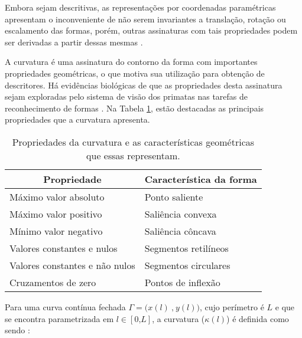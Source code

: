 
Embora sejam descritivas, as representações por coordenadas paramétricas apresentam o inconveniente de não serem invariantes a translação, rotação ou escalamento das formas, porém, outras assinaturas com tais propriedades podem ser derivadas a partir dessas mesmas \cite{Kindratenko:2003}.


A curvatura é uma assinatura do contorno da forma com importantes propriedades geométricas, o que motiva sua utilização para obtenção de descritores. Há evidências biológicas de que as propriedades desta assinatura sejam exploradas pelo sistema de visão dos primatas nas tarefas de reconhecimento de formas \cite{Costa:2009}. Na Tabela \ref{tbl:curv}, estão destacadas as principais propriedades que a curvatura apresenta.  

\begin{table}
\centering
\caption{\label{tbl:curv} Propriedades da curvatura e as características geométricas que essas representam.}
\begin{tabular}[]{ll}
\toprule
\multicolumn{1}{c|}{Propriedade} & \multicolumn{1}{c}{Característica da forma}\\ 
\hline
Máximo valor absoluto & Ponto saliente \\
Máximo valor positivo & Saliência convexa \\
Mínimo valor negativo & Saliência côncava \\
Valores constantes e nulos & Segmentos retilíneos \\
Valores constantes e não nulos & Segmentos circulares \\
Cruzamentos de zero & Pontos de inflexão \\ \bottomrule
\end{tabular}
\end{table}

Para uma curva contínua fechada $\Gamma = \big(x(l)\:\text{,}\:y(l)\big)$,  cujo perímetro é $L$ e que se encontra parametrizada em $l \in [0\text{,}L]$, a curvatura ($\kappa(l)$) é definida como sendo \cite{Kindratenko:2003}:

